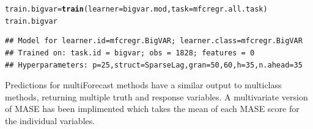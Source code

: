 \documentclass{article}\usepackage[]{graphicx}\usepackage[]{color}
\makeatletter
\newcommand{\hlstd}[1]{\textcolor[rgb]{0.345,0.345,0.345}{#1}}%
\newcommand{\hlkwb}[1]{\textcolor[rgb]{0.69,0.353,0.396}{#1}}%
\newcommand{\hlkwc}[1]{\textcolor[rgb]{0.333,0.667,0.333}{#1}}%
\newcommand{\hlkwd}[1]{\textcolor[rgb]{0.737,0.353,0.396}{\textbf{#1}}}%
\newenvironment{kframe}{%
 \def\at@end@of@kframe{}%
 \ifinner\ifhmode%
  \def\at@end@of@kframe{\end{minipage}}%
  \begin{minipage}{\columnwidth}%
 \fi\fi%
 \def\FrameCommand##1{\hskip\@totalleftmargin \hskip-\fboxsep
 \colorbox{shadecolor}{##1}\hskip-\fboxsep
     \hskip-\linewidth \hskip-\@totalleftmargin \hskip\columnwidth}%
 \MakeFramed {\advance\hsize-\width
   \@totalleftmargin\z@ \linewidth\hsize
   \@setminipage}}%
 {\par\unskip\endMakeFramed%
 \at@end@of@kframe}
\newenvironment{knitrout}{}{} %
\theoremstyle{definition}
\newcommand\code{\@codex}
\def\@codex#1{{\normalfont\ttfamily\hyphenchar\font=-1 #1}}
\makeatother
\begin{document}
\begin{knitrout}
\color{fgcolor}\begin{kframe}
\begin{alltt}
\hlstd{train.bigvar} \hlkwb{=} \hlkwd{train}\hlstd{(}\hlkwc{learner} \hlstd{= bigvar.mod,} \hlkwc{task} \hlstd{= mfcregr.all.task )}
\hlstd{train.bigvar}
\end{alltt}
\end{kframe}
\end{knitrout}

\begin{knitrout}
\color{fgcolor}\begin{kframe}
\begin{verbatim}
## Model for learner.id=mfcregr.BigVAR; learner.class=mfcregr.BigVAR
## Trained on: task.id = bigvar; obs = 1828; features = 0
## Hyperparameters: p=25,struct=SparseLag,gran=50,60,h=35,n.ahead=35
\end{verbatim}
\end{kframe}
\end{knitrout}

Predictions for \code{multiForecast} methods have a similar output to \code{multiclass} methods, returning multiple truth and response variables. A multivariate version of MASE has been implimented which takes the mean of each MASE score for the individual variables.
\end{document}
